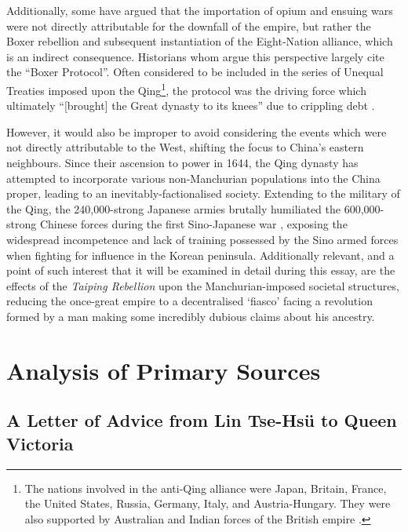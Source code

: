 \documentclass{article}
\begin{document}
        Additionally, some have argued that the importation of opium and ensuing wars were not directly attributable for the downfall of the empire, but rather the Boxer rebellion and subsequent instantiation of the Eight-Nation alliance, which is an indirect consequence. Historians whom argue this perspective largely cite the ``Boxer Protocol''. Often considered to be included in the series of Unequal Treaties imposed upon the Qing\footnote{The nations involved in the anti-Qing alliance were Japan, Britain, France, the United States, Russia, Germany, Italy, and Austria-Hungary. They were also supported by Australian and Indian forces of the British empire \autocite{Gardener:2016}.}, the protocol was the driving force which ultimately ``[brought] the Great dynasty to its knees'' due to crippling debt \autocite{Mitchell:2008}.

        However, it would also be improper to avoid considering the events which were not directly attributable to the West, shifting the focus to China's eastern neighbours. Since their ascension to power in 1644, the Qing dynasty has attempted to incorporate various non-Manchurian populations into the China proper, leading to an inevitably-factionalised society. Extending to the military of the Qing, the 240,000-strong Japanese armies brutally humiliated the 600,000-strong Chinese forces during the first Sino-Japanese war \autocite{Fenby:2013}, exposing the widespread incompetence and lack of training possessed by the Sino armed forces \autocite{Jowett:2013} when fighting for influence in the Korean peninsula. Additionally relevant, and a point of such interest that it will be examined in detail during this essay, are the effects of the \textit{Taiping Rebellion} upon the Manchurian-imposed societal structures, reducing the once-great empire to a decentralised `fiasco' facing a revolution formed by a man making some incredibly dubious claims about his ancestry.

\section{Analysis of Primary Sources}

\subsection{A Letter of Advice from Lin Tse-Hs\"u to Queen Victoria}
\end{document}
